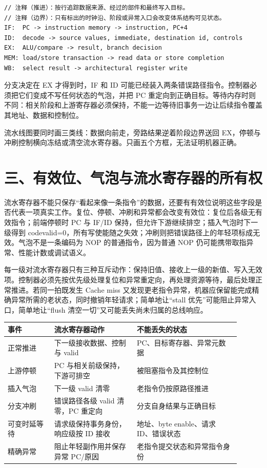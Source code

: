 \begin{lstlisting}
// 注释（推进）：按行追踪数据来源、经过的部件和最终写入目标。
// 注释（边界）：只有标出的时钟沿、阶段或异常入口会改变体系结构可见状态。
IF:  PC -> instruction memory -> instruction, PC+4
ID:  decode -> source values, immediate, destination id, controls
EX:  ALU/compare -> result, branch decision
MEM: load/store transaction -> read data or store completion
WB:  select result -> architectural register write
\end{lstlisting}

分支决定在 EX 才得到时，IF 和 ID 可能已经装入两条错误路径指令。控制器必须把它们变成不写任何状态的气泡，并把 PC 重定向到正确目标。等待内存时则不同：相关阶段和上游寄存器必须保持，不能一边等待旧事务一边让后续指令覆盖其地址、数据和控制位。

\begin{classicnote}
流水线图要同时画三类线：数据向前走，旁路结果逆着阶段边界送回 EX，停顿与冲刷控制横向冻结或清空流水寄存器。只画五个方框，无法证明机器正确。
\end{classicnote}
\section{三、有效位、气泡与流水寄存器的所有权}

流水寄存器不能只保存“看起来像一条指令”的数据，还要有有效位说明这些字段是否代表一项真实工作。复位、停顿、冲刷和异常都会改变有效位：复位后各级无有效指令；前端停顿时 PC 与 IF/ID 保持，但允许下游继续排空；插入气泡时下一级得到 code{valid=0}，所有写使能随之失效；冲刷则把错误路径上的年轻项标成无效。气泡不是一条编码为 NOP 的普通指令，因为普通 NOP 仍可能携带取指异常、性能计数或调试语义。

每一级对流水寄存器只有三种互斥动作：保持旧值、接收上一级的新值、写入无效项。控制器必须先按优先级处理复位和异常重定向，再处理资源等待，最后处理正常推进。若同一拍既发生 Cache miss 又发现更老指令异常，机器应保留能完成精确异常所需的老状态，同时撤销年轻请求；简单地让“stall 优先”可能阻止异常入口，简单地让“flush 清空一切”又可能丢失尚未归属的总线响应。

\begin{longtable}{L{0.18\linewidth}L{0.32\linewidth}L{0.40\linewidth}}
\toprule
事件 & 流水寄存器动作 & 不能丢失的状态 \\
\midrule
正常推进 & 下一级接收数据、控制与 valid & PC、目标寄存器、异常元数据 \\\tablerowrule
上游停顿 & PC 与相关前级保持，下游可排空 & 被阻塞指令及其控制位 \\\tablerowrule
插入气泡 & 下一级 valid 清零 & 老指令仍按原路径推进 \\\tablerowrule
分支冲刷 & 错误路径各级 valid 清零，PC 重定向 & 分支自身结果与正确目标 \\\tablerowrule
可变时延等待 & 请求级保持事务身份，响应级按 ID 接收 & 地址、byte enable、请求 ID、错误状态 \\\tablerowrule
精确异常 & 阻止年轻副作用并保存异常 PC/原因 & 老指令提交状态和异常指令身份 \\
\bottomrule
\end{longtable}

